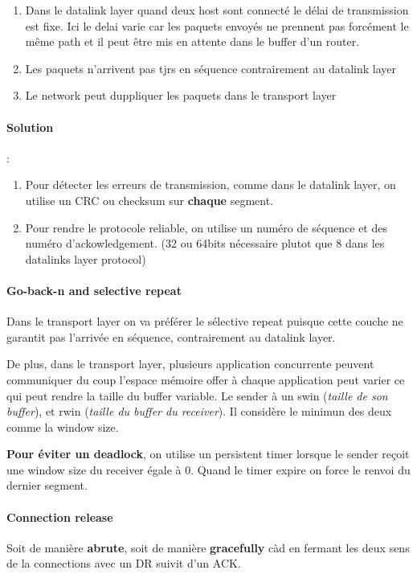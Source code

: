 \begin{enumerate}
    \item Dans  le datalink  layer quand  deux host  sont
connecté le délai de transmission est fixe. Ici le delai varie car les
paquets envoyés  ne prennent pas  forcément le  même path et  il peut
être mis en attente dans le buffer d'un router.
    \item Les paquets n'arrivent pas tjrs en séquence contrairement au datalink layer
    \item Le network peut duppliquer les paquets dans le transport layer
\end{enumerate}

\paragraph{Solution} :
\begin{enumerate}
    \item Pour détecter les erreurs de transmission, comme dans le datalink layer, on utilise un
    CRC ou checksum sur \textbf{chaque} segment.
    \item Pour rendre le protocole reliable, on utilise un numéro de séquence et des numéro
    d'ackowledgement. (32 ou 64bits nécessaire plutot que 8 dans les datalinks layer protocol)
\end{enumerate}

\paragraph{Go-back-n and selective repeat}
Dans le transport layer on va préférer le sélective repeat puisque cette couche
ne garantit pas l'arrivée en séquence, contrairement au datalink layer.

De plus, dans le transport layer, plusieurs application concurrente peuvent communiquer
du coup l'espace mémoire offer à chaque application peut varier ce qui peut rendre la
taille du buffer variable.
Le sender à un swin (\textit{taille de son buffer}), et rwin (\textit{taille du buffer du receiver}). Il considère le minimun des deux comme la window size.


\textbf{Pour éviter un deadlock}, on utilise un persistent timer lorsque le sender reçoit une
window size du receiver égale à 0. Quand le timer expire on force le renvoi du dernier segment.

\paragraph{Connection release}
Soit de manière \textbf{abrute}, soit de manière \textbf{gracefully} càd en fermant
les deux sens de la connections avec un DR suivit d'un ACK.


